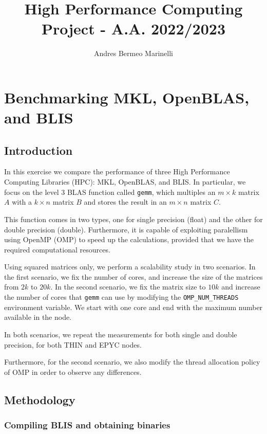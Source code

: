 \documentclass{report}
\title{High Performance Computing Project - A.A. 2022/2023}
\author{Andres Bermeo Marinelli}
\begin{document}
\maketitle
\tableofcontents
\chapter{Benchmarking MKL, OpenBLAS, and BLIS}

\section{Introduction}

In this exercise we compare the performance of three High Performance Computing 
Libraries (HPC): MKL, OpenBLAS, and BLIS. In particular, we focus on the level 3 BLAS 
function called \texttt{gemm}, which multiples an $m \times k$ matrix $A$ with 
a $k \times n$ matrix $B$ and stores the result in an $m \times n$ matrix $C$. 

This function comes in two types, one for single 
precision (float) and the other for double precision (double). Furthermore, it 
is capable of exploiting paralellism using OpenMP (OMP) to speed up the 
calculations, provided that we have the required computational resources.

Using squared matrices only, we perform a scalability study in two scenarios. 
In the first scenario, we fix the number of cores, and increase the size of the
matrices from $2k$ to $20k$. In the second scenario, we fix the matrix size 
to $10k$ and increase the number of cores that \texttt{gemm} can use by 
modifying the \texttt{OMP\_NUM\_THREADS} environment variable. We start with one 
core and end with the maximum number available in the node.

In both scenarios, we repeat the measurements for both single and double
precision, for both THIN and EPYC nodes.

Furthermore, for the second scenario, we also modify the thread allocation policy 
of OMP in order to observe any differences.

\section{Methodology}

\subsection{Compiling BLIS and obtaining binaries}
\end{document}
